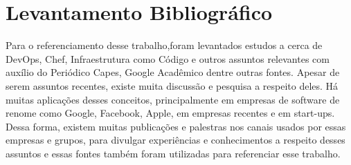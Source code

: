 \section{Levantamento Bibliográfico}

Para o referenciamento desse trabalho,foram levantados estudos a cerca de
DevOps, Chef, Infraestrutura como Código e outros assuntos relevantes com
auxílio do Periódico Capes, Google Acadêmico dentre outras fontes.
Apesar de serem assuntos recentes, existe muita discussão e pesquisa a
respeito deles. Há muitas aplicações desses conceitos, principalmente
em empresas de software de renome como Google, Facebook, Apple, em
empresas recentes e em start-ups. Dessa forma, existem muitas publicações e %
palestras nos canais usados por essas empresas e grupos, para divulgar
experiências e conhecimentos a respeito desses assuntos e essas fontes
também foram utilizadas para referenciar esse trabalho.



